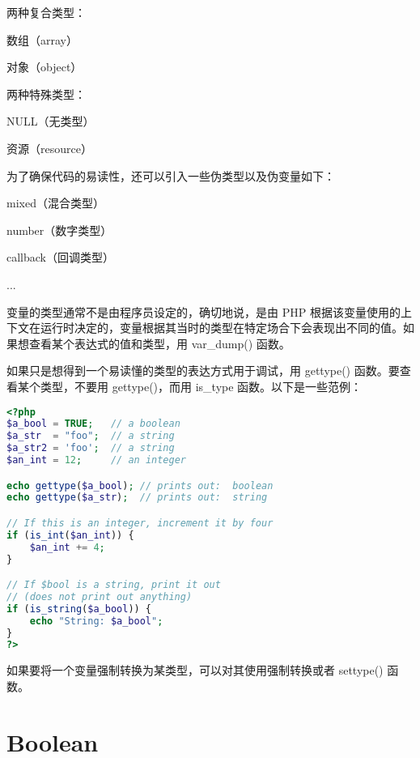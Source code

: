 两种复合类型：

\begin{compactitem}
\item 数组（array）
\item 对象（object）
\end{compactitem}

两种特殊类型：


\begin{compactitem}
\item NULL（无类型）
\item 资源（resource）
\end{compactitem}

为了确保代码的易读性，还可以引入一些伪类型以及伪变量如下：

\begin{compactitem}
\item mixed（混合类型）
\item number（数字类型）
\item callback（回调类型）
\item ...
\end{compactitem}

变量的类型通常不是由程序员设定的，确切地说，是由 PHP 根据该变量使用的上下文在运行时决定的，变量根据其当时的类型在特定场合下会表现出不同的值。如果想查看某个表达式的值和类型，用 var\_dump() 函数。

如果只是想得到一个易读懂的类型的表达方式用于调试，用 gettype() 函数。要查看某个类型，不要用 gettype()，而用 is\_type 函数。以下是一些范例：

\begin{lstlisting}[language=PHP]
<?php
$a_bool = TRUE;   // a boolean
$a_str  = "foo";  // a string
$a_str2 = 'foo';  // a string
$an_int = 12;     // an integer

echo gettype($a_bool); // prints out:  boolean
echo gettype($a_str);  // prints out:  string

// If this is an integer, increment it by four
if (is_int($an_int)) {
    $an_int += 4;
}

// If $bool is a string, print it out
// (does not print out anything)
if (is_string($a_bool)) {
    echo "String: $a_bool";
}
?>
\end{lstlisting}


如果要将一个变量强制转换为某类型，可以对其使用强制转换或者 settype() 函数。


\section{Boolean}

